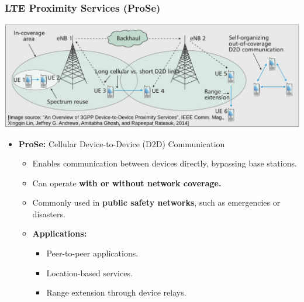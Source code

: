 \subsubsection{LTE Proximity Services (ProSe)}
\includegraphics[width=0.7\columnwidth]{Resources/prose.png} 
\begin{itemize}
    \item \textbf{ProSe:} Cellular Device-to-Device (D2D) Communication
    \begin{itemize}
        \item Enables communication between devices directly, bypassing base stations.
        \item Can operate \textbf{with or without network coverage.}
        \item Commonly used in \textbf{public safety networks}, such as emergencies or disasters.
        \item \textbf{Applications:}
        \begin{itemize}
            \item Peer-to-peer applications.
            \item Location-based services.
            \item Range extension through device relays.
        \end{itemize}
    \end{itemize}


\end{itemize}
